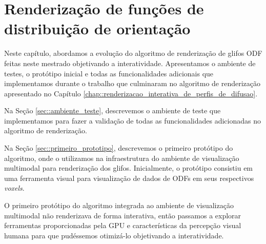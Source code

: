 \documentclass[
    12pt,                %
    oneside,            %
    a4paper,            %
    english,            %
    french,                %
    spanish,            %
    brazil                %
    ]{abntex2}
\begin{document}





\chapter{Renderização de funções de distribuição de orientação}
\label{chap::renderizacao_de_perfis_de_difusao}

Neste capítulo, abordamos a evolução do algoritmo de renderização de glifos ODF feitas neste mestrado objetivando a interatividade. Apresentamos o ambiente de testes, o protótipo inicial e todas as funcionalidades adicionais que implementamos durante o trabalho que culminaram no algoritmo de renderização apresentado no Capítulo \ref{chap::renderizacao_interativa_de_perfis_de_difusao}.

Na Seção \ref{sec::ambiente_teste}, descrevemos o ambiente de teste que implementamos para fazer a validação  de todas as funcionalidades adicionadas no algoritmo de renderização.


Na Seção \ref{sec::primeiro_prototipo}, descrevemos o primeiro protótipo do algoritmo, onde o utilizamos na infraestrutura do ambiente de visualização multimodal para renderização dos glifos. Inicialmente, o protótipo consistiu em uma ferramenta visual para visualização de dados de ODFs em seus respectivos \textit{voxels}.

O primeiro protótipo do algoritmo integrada ao ambiente de visualização multimodal não renderizava de forma interativa, então passamos a explorar ferramentas proporcionadas pela GPU e características da percepção visual humana para que pudéssemos otimizá-lo objetivando a interatividade.
\end{document}
